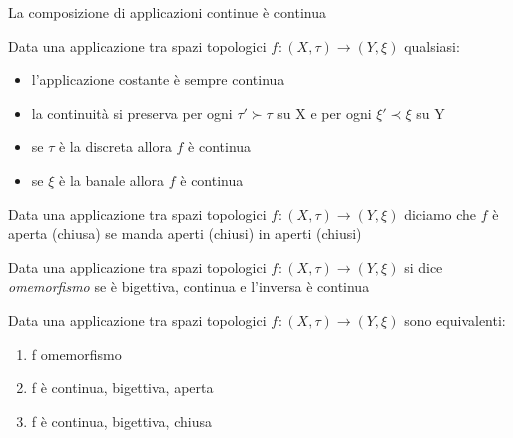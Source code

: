 \documentclass[a4paper]{article}
\begin{document}
\begin{prop}

\end{prop}

\begin{prop} La composizione di applicazioni continue è continua
\end{prop}

\begin{osss}
Data una applicazione tra spazi topologici $f:(X,\tau) \to (Y,\xi )$ qualsiasi:
\begin{itemize}
	\item l'applicazione costante è sempre continua
	\item la continuità si preserva per ogni $\tau ' \succ \tau$ su X e per ogni $\xi ' \prec \xi $ su Y
	\item se $\tau$ è la discreta allora $f$  è continua
	\item se $\xi $ è la banale allora $f$ è continua
\end{itemize}
\end{osss}

\begin{deff}
Data una applicazione tra spazi topologici $f:(X,\tau) \to (Y,\xi )$ diciamo che $f$ è aperta (chiusa) se manda aperti (chiusi) in aperti (chiusi)
\end{deff}

\begin{deff}
Data una applicazione tra spazi topologici $f:(X,\tau) \to (Y,\xi )$ si dice \emph{omemorfismo} se è bigettiva, continua e l'inversa è continua
\end{deff}

\begin{prop}
Data una applicazione tra spazi topologici $f:(X,\tau) \to (Y,\xi )$ sono equivalenti: 
\begin{enumerate} 
	\item f omemorfismo
	\item f è continua, bigettiva, aperta
	\item f è continua, bigettiva, chiusa
\end{enumerate}
\end{prop}
\end{document}

